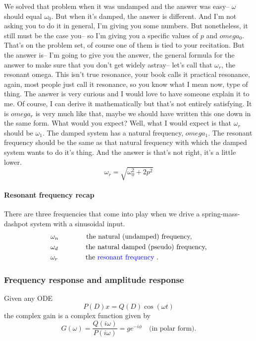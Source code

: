 We solved that problem when it was undamped
and the answer was easy--
$\omega$ should equal $\omega _0$.
But when it's damped, the answer is different.
And I'm not asking you to do it in general,
I'm giving you some numbers.
But nonetheless, it still must be the case you--
so I'm giving you a specific values of $p$ and $omega_ 0$.
That's on the problem set, of course one of them
is tied to your recitation.
But the answer is--
I'm going to give you the answer, the general formula
for the answer to make sure that you don't get widely astray--
let's call that $\omega _r$, the resonant omega.
This isn't true resonance, your book
calls it practical resonance, again, most people just
call it resonance, so you know what I mean now, type of thing.
The answer is very curious and I would
love to have someone explain it to me.
Of course, I can derive it mathematically
but that's not entirely satisfying.
It is $omega _r$ is very much like that,
maybe we should have written this one down in the same form.
What would you expect?
Well, what I would expect is that $\omega _r$ should be $\omega _1$.
The damped system has a natural frequency, $omega _1$.
The resonant frequency should be the same
as that natural frequency with which the damped system wants
to do it's thing.
And the answer is that's not right, it's a little lower.
\begin{equation*}
  \omega _r = \sqrt{\omega _0^2 + 2p^2}
\end{equation*}

\paragraph{Resonant frequency recap}
There are three frequencies that come into play when we drive a spring-mass-dashpot system with a sinusoidal input.
\begin{align*}
  &\omega _n \qquad \qquad \text{the natural (undamped) frequency,} \\
  &\omega _d \qquad \qquad \text{the natural damped (pseudo) frequency,} \\
  &\omega _r \qquad \qquad \text{the {\color{blue}resonant frequency} .} 
\end{align*}
\clearpage

\subsubsection{Frequency response and amplitude response}
Given any ODE
\begin{equation*}
  P(D)x = Q(D)\cos (\omega t)
\end{equation*}
the complex gain is a complex function given by
\begin{equation*}
  G(\omega ) = \frac{Q(i \omega )}{P(i \omega )} = ge^{-i\phi } \quad \text {(in polar form)}.
\end{equation*}

